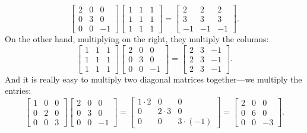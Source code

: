 \begin{equation*}
\begin{bmatrix}
2 & 0 & 0 \\
0 & 3 & 0 \\
0 & 0 & -1
\end{bmatrix}
\begin{bmatrix}
1 & 1 & 1 \\
1 & 1 & 1 \\
1 & 1 & 1
\end{bmatrix}
=
\begin{bmatrix}
2 & 2 & 2 \\
3 & 3 & 3 \\
-1 & -1 & -1
\end{bmatrix} .
\end{equation*}
On the other hand, multiplying on the right, they multiply the columns:
\begin{equation*}
\begin{bmatrix}
1 & 1 & 1 \\
1 & 1 & 1 \\
1 & 1 & 1
\end{bmatrix}
\begin{bmatrix}
2 & 0 & 0 \\
0 & 3 & 0 \\
0 & 0 & -1
\end{bmatrix}
=
\begin{bmatrix}
2 & 3 & -1 \\
2 & 3 & -1 \\
2 & 3 & -1
\end{bmatrix} .
\end{equation*}
And it is really easy to multiply two diagonal matrices together---we
multiply the entries:
\begin{equation*}
\begin{bmatrix}
1 & 0 & 0 \\
0 & 2 & 0 \\
0 & 0 & 3
\end{bmatrix}
\begin{bmatrix}
2 & 0 & 0 \\
0 & 3 & 0 \\
0 & 0 & -1
\end{bmatrix}
=
\begin{bmatrix}
1 \cdot 2 & 0 & 0 \\
0 & 2 \cdot 3 & 0 \\
0 & 0 & 3 \cdot (-1)
\end{bmatrix}
=
\begin{bmatrix}
2 & 0 & 0 \\
0 & 6 & 0 \\
0 & 0 & -3
\end{bmatrix} .
\end{equation*}

